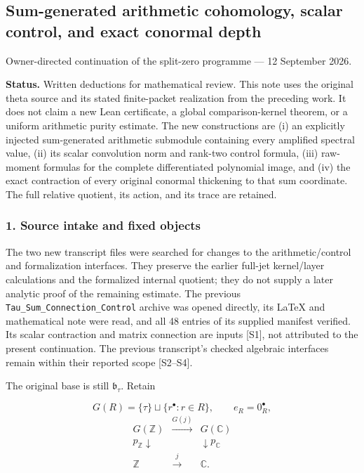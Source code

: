 


\subsection{Sum-generated arithmetic cohomology, scalar control, and exact
conormal
depth}\label{cyclic_sum:sum-generated-arithmetic-cohomology-scalar-control-and-exact-conormal-depth}

Owner-directed continuation of the split-zero programme --- 12 September
2026.

\textbf{Status.} Written deductions for mathematical review. This note
uses the original theta source and its stated finite-packet realization
from the preceding work. It does not claim a new Lean certificate, a
global comparison-kernel theorem, or a uniform arithmetic purity
estimate. The new constructions are (i) an explicitly injected
sum-generated arithmetic submodule containing every amplified spectral
value, (ii) its scalar convolution norm and rank-two control formula,
(iii) raw-moment formulas for the complete differentiated polynomial
image, and (iv) the exact contraction of every original conormal
thickening to that sum coordinate. The full relative quotient, its
action, and its trace are retained.

\subsubsection{1. Source intake and fixed
objects}\label{cyclic_sum:source-intake-and-fixed-objects}

The two new transcript files were searched for changes to the
arithmetic/control and formalization interfaces. They preserve the
earlier full-jet kernel/layer calculations and the formalized internal
quotient; they do not supply a later analytic proof of the remaining
estimate. The previous \nolinkurl{Tau_Sum_Connection_Control} archive
was opened directly, its LaTeX and mathematical note were read, and all
48 entries of its supplied manifest verified. Its scalar contraction and
matrix connection are inputs {[}S1{]}, not attributed to the present
continuation. The previous transcript's checked algebraic interfaces
remain within their reported scope {[}S2--S4{]}.

The original base is still \(\mathfrak b_\tau\). Retain

\[G(R)=\{\tau\}\sqcup\{r^\bullet:r\in R\},\qquad e_R=0_R^\bullet,\]
\[\begin{array}{ccc}
G(\mathbb Z)&\xrightarrow{G(j)}&G(\mathbb C)\\
p_{\mathbb Z}\downarrow&&\downarrow p_{\mathbb C}\\
\mathbb Z&\xrightarrow{j}&\mathbb C .
\end{array}\tag{1.1}\]

